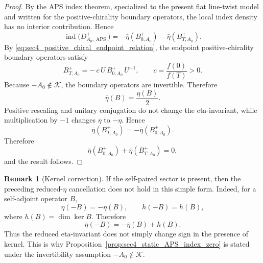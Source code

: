 \documentclass[11pt]{article}
\theoremstyle{definition}
\newtheorem{remark}[remark]{Remark}
\DeclareMathOperator{\ind}{ind}
\DeclareMathOperator{\APS}{APS}
\numberwithin{equation}{section}
\begin{document}
\begin{proof}
By the APS index theorem, specialized to the present flat line-twist model and written for the
positive-chirality boundary operators, the local index density has no interior contribution. Hence
\begin{equation}
\ind\!\bigl(D_{A_0,\APS}^{+}\bigr)
=
-\bar\eta\!\left(B^{+}_{0,A_0}\right)
-\bar\eta\!\left(B^{+}_{T,A_0}\right).
\end{equation}
By \eqref{eq:sec4_positive_chiral_endpoint_relation}, the endpoint positive-chirality boundary
operators satisfy
\begin{equation}
B^{+}_{T,A_0}
=
-\,c\,U\,B^{+}_{0,A_0}\,U^{-1},
\qquad
c=\frac{f(0)}{f(T)}>0.
\end{equation}
Because \(-A_0\notin\mathcal K\), the boundary operators are invertible. Therefore
\begin{equation}
\bar\eta(B)=\frac{\eta(B)}{2}.
\end{equation}
Positive rescaling and unitary conjugation do not change the eta-invariant, while multiplication
by \(-1\) changes \(\eta\) to \(-\eta\). Hence
\begin{equation}
\bar\eta\!\left(B^{+}_{T,A_0}\right)
=
-\bar\eta\!\left(B^{+}_{0,A_0}\right).
\end{equation}
Therefore
\begin{equation}
\bar\eta\!\left(B^{+}_{0,A_0}\right)
+
\bar\eta\!\left(B^{+}_{T,A_0}\right)
=
0,
\end{equation}
and the result follows.
\end{proof}


\begin{remark}[Kernel correction]
\label{rem:sec4_eta_kernel_correction}
If the self-paired sector is present, then the preceding reduced-\(\eta\) cancellation does not
hold in this simple form. Indeed, for a self-adjoint operator \(B\),
\begin{equation}
\eta(-B)=-\eta(B),
\qquad
h(-B)=h(B),
\end{equation}
where \(h(B)=\dim\ker B\). Therefore
\begin{equation}
\bar\eta(-B)
=
-\bar\eta(B)+h(B).
\end{equation}
Thus the reduced eta-invariant does not simply change sign in the presence of kernel. This is
why Proposition~\ref{prop:sec4_static_APS_index_zero} is stated under the invertibility assumption
\(-A_0\notin\mathcal K\).
\end{remark}
\end{document}
